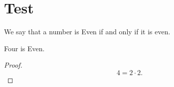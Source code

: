 
\section{Test}

\begin{definition} [Even]
  \label{def:Even}
  \leanok
  We say that a number is Even if and only if it is even.
\end{definition}

\begin{theorem}
  \label{thm:Even_four}
  \leanok
  Four is Even.
\end{theorem}
\begin{proof}
  \leanok
  \[
  4 = 2 \cdot 2.
  \]
\end{proof}

